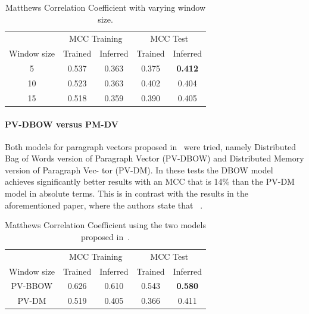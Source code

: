 \begin{table}[h]
  \begin{center}
    \begin{tabular}{ c | *2c | *2c }
      \toprule
       & \multicolumn{2}{c|}{MCC Training} & \multicolumn{2}{|c}{MCC Test}\\
      Window size & Trained & Inferred & Trained & Inferred \\
      \midrule
      5 & 0.537 & 0.363 & 0.375 & \textbf{0.412} \\
      10 & 0.523 & 0.363 & 0.402 & 0.404 \\
      15 & 0.518 & 0.359 & 0.390 & 0.405 \\
    \bottomrule
    \end{tabular}
  \caption{Matthews Correlation Coefficient with varying window size.}
\label{tab:Paragraph Vector Parameter Results Window Size}
\end{center}
\end{table}

\paragraph{PV-DBOW versus PM-DV}
Both models for paragraph vectors proposed in~\cite{Le:2014aa} were tried, namely Distributed Bag of Words version of Paragraph Vector (PV-DBOW) and Distributed Memory version of Paragraph Vec- tor (PV-DM). In these tests the DBOW model achieves significantly better results with an MCC that is 14\% than the PV-DM model in absolute terms. This is in contrast with the results in the aforementioned paper, where the authors state that ~\cite{Le:2014aa}.

\begin{table}[h]
  \begin{center}
    \begin{tabular}{ c | *2c | *2c }
      \toprule
       & \multicolumn{2}{c|}{MCC Training} & \multicolumn{2}{|c}{MCC Test}\\
      Window size & Trained & Inferred & Trained & Inferred \\
      \midrule
      PV-BBOW & 0.626 & 0.610 & 0.543 & \textbf{0.580} \\
      PV-DM & 0.519 & 0.405 & 0.366 & 0.411 \\
    \bottomrule
    \end{tabular}
    \caption{Matthews Correlation Coefficient using the two models proposed in~\cite{Le:2014aa}.}
\label{tab:Paragraph Vector Parameter Results PV-DBOW versus PM-DV}
\end{center}
\end{table}

